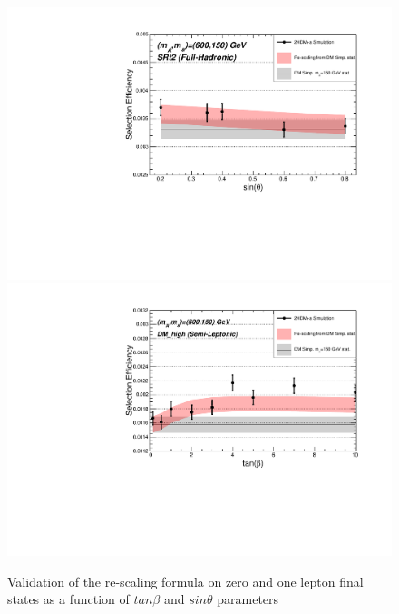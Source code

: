 \begin{figure}
\includegraphics[width=.5\textwidth]{texinputs/04_grid/figures/DMHF/SRt2_600_150_sin}
\includegraphics[width=.5\textwidth]{texinputs/04_grid/figures/DMHF/DM_high_600_150_tan}
\caption{Validation of the re-scaling formula on zero and one lepton final states as a function of $tan\beta$ and $sin\theta$ parameters}
\label{DMHF:pof}
\end{figure}

